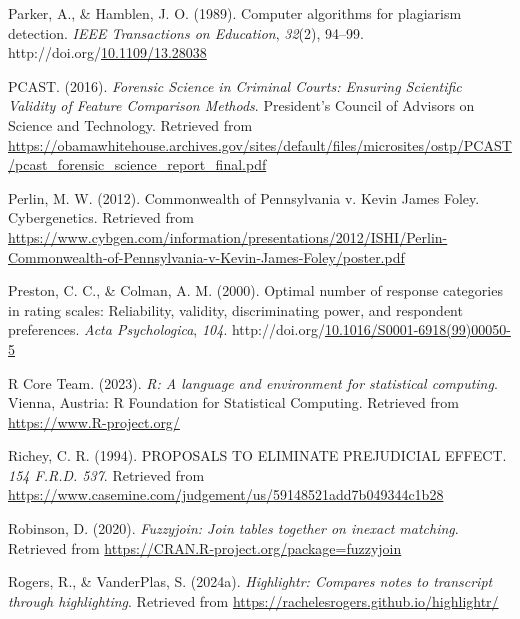 \documentclass[print]{nuthesis}
\newlength{\cslhangindent}
\newenvironment{CSLReferences}[2]%
{\setlength{\parindent}{0pt}%
\everypar{\setlength{\hangindent}{\cslhangindent}}\ignorespaces}%
{\par}
\begin{document}
\begin{CSLReferences}{1}{0}
\leavevmode{}%
Parker, A., \& Hamblen, J. O. (1989). Computer algorithms for plagiarism detection. \emph{IEEE Transactions on Education}, \emph{32}(2), 94--99. http://doi.org/\href{https://doi.org/10.1109/13.28038}{10.1109/13.28038}

\leavevmode{}%
PCAST. (2016). \emph{Forensic {Science} in {Criminal} {Courts}: {Ensuring} {Scientific} {Validity} of {Feature} {Comparison} {Methods}}. {President's Council of Advisors on Science and Technology}. Retrieved from \url{https://obamawhitehouse.archives.gov/sites/default/files/microsites/ostp/PCAST/pcast_forensic_science_report_final.pdf}

\leavevmode{}%
Perlin, M. W. (2012). Commonwealth of {Pennsylvania} v. {Kevin James Foley}. Cybergenetics. Retrieved from \url{https://www.cybgen.com/information/presentations/2012/ISHI/Perlin-Commonwealth-of-Pennsylvania-v-Kevin-James-Foley/poster.pdf}

\leavevmode{}%
Preston, C. C., \& Colman, A. M. (2000). Optimal number of response categories in rating scales: Reliability, validity, discriminating power, and respondent preferences. \emph{Acta Psychologica}, \emph{104}. http://doi.org/\href{https://doi.org/10.1016/S0001-6918(99)00050-5}{10.1016/S0001-6918(99)00050-5}

\leavevmode{}%
R Core Team. (2023). \emph{R: A language and environment for statistical computing}. Vienna, Austria: R Foundation for Statistical Computing. Retrieved from \url{https://www.R-project.org/}

\leavevmode{}%
Richey, C. R. (1994). PROPOSALS TO ELIMINATE PREJUDICIAL EFFECT. \emph{154 {F}.{R}.{D}. 537}. Retrieved from \url{https://www.casemine.com/judgement/us/59148521add7b049344c1b28}

\leavevmode{}%
Robinson, D. (2020). \emph{Fuzzyjoin: Join tables together on inexact matching}. Retrieved from \url{https://CRAN.R-project.org/package=fuzzyjoin}

\leavevmode{}%
Rogers, R., \& VanderPlas, S. (2024a). \emph{Highlightr: Compares notes to transcript through highlighting}. Retrieved from \url{https://rachelesrogers.github.io/highlightr/}


\end{CSLReferences}
\end{document}
